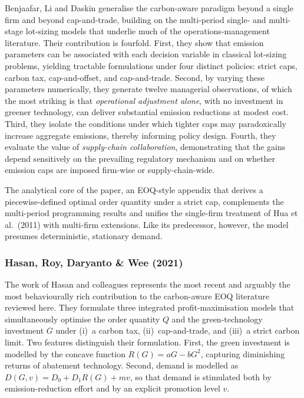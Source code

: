 \documentclass[11pt,a4paper]{article}
\begin{document}
Benjaafar, Li and Daskin generalise the carbon-aware paradigm beyond a
single firm and beyond cap-and-trade, building on the multi-period
single- and multi-stage lot-sizing models that underlie much of the
operations-management literature. Their contribution is fourfold.
First, they show that emission parameters can be associated with each
decision variable in classical lot-sizing problems, yielding tractable
formulations under four distinct policies: strict caps, carbon tax,
cap-and-offset, and cap-and-trade. Second, by varying these parameters
numerically, they generate twelve managerial observations, of which the
most striking is that \emph{operational adjustment alone}, with no
investment in greener technology, can deliver substantial emission
reductions at modest cost. Third, they isolate the conditions under
which tighter caps may paradoxically increase aggregate emissions,
thereby informing policy design. Fourth, they evaluate the value of
\emph{supply-chain collaboration}, demonstrating that the gains depend
sensitively on the prevailing regulatory mechanism and on whether
emission caps are imposed firm-wise or supply-chain-wide.

The analytical core of the paper, an EOQ-style appendix that derives a
piecewise-defined optimal order quantity under a strict cap, complements
the multi-period programming results and unifies the single-firm
treatment of Hua et al.\ (2011) with multi-firm extensions. Like its
predecessor, however, the model presumes deterministic, stationary
demand.

\subsubsection*{Hasan, Roy, Daryanto \& Wee (2021)}

The work of Hasan and colleagues represents the most recent and
arguably the most behaviourally rich contribution to the
carbon-aware EOQ literature reviewed here. They formulate three
integrated profit-maximisation models that simultaneously optimise the
order quantity $Q$ and the green-technology investment $G$ under (i)~a
carbon tax, (ii)~cap-and-trade, and (iii)~a strict carbon limit. Two
features distinguish their formulation. First, the green investment is
modelled by the concave function $R(G)=aG-bG^{2}$, capturing
diminishing returns of abatement technology. Second, demand is modelled as
$D(G,v)=D_{0}+D_{1}R(G)+mv$, so that demand is stimulated both by
emission-reduction effort and by an explicit promotion level $v$.
\end{document}
